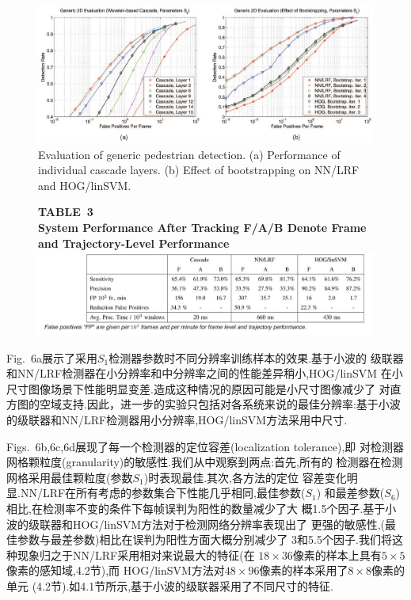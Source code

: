 \documentclass[10pt,letterpaper,journal,compsoc]{IEEEtran}
\begin{document}
\begin{figure}[!b]
\centering
\includegraphics[width=5in]{fig7.JPG}
\caption{Evaluation of generic pedestrian detection. (a) Performance of individual cascade layers. (b) Effect of bootstrapping on NN/LRF and
HOG/linSVM.}
\end{figure}
\begin{figure}[!b]
\centering
\large{\textbf{TABLE~3\\
System Performance After Tracking F/A/B Denote Frame and Trajectory-Level Performance
}}
\includegraphics[width=7in]{table3.JPG}
\end{figure}
Fig.~6a展示了采用$S_1$检测器参数时不同分辨率训练样本的效果.基于小波的
级联器和NN/LRF检测器在小分辨率和中分辨率之间的性能差异稍小,HOG/linSVM
在小尺寸图像场景下性能明显变差.造成这种情况的原因可能是小尺寸图像减少了
对直方图的空域支持.因此，进一步的实验只包括对各系统来说的最佳分辨率:基于小波
的级联器和NN/LRF检测器用小分辨率,HOG/linSVM方法采用中尺寸.

Figs.~6b,6c,6d展现了每一个检测器的定位容差(localization tolerance),即
对检测器网格颗粒度(granularity)的敏感性.我们从中观察到两点:首先,所有的
检测器在检测网格采用最佳颗粒度(参数$S_1$)时表现最佳.其次,各方法的定位
容差变化明显.NN/LRF在所有考虑的参数集合下性能几乎相同,最佳参数($S_1$)
和最差参数($S_6$)相比,在检测率不变的条件下每帧误判为阳性的数量减少了大
概1.5个因子.基于小波的级联器和HOG/linSVM方法对于检测网络分辨率表现出了
更强的敏感性,(最佳参数与最差参数)相比在误判为阳性方面大概分别减少了
3和5.5个因子.我们将这种现象归之于NN/LRF采用相对来说最大的特征(在
$18\times36$像素的样本上具有$5\times5$像素的感知域,4.2节),而
HOG/linSVM方法对$48\times96$像素的样本采用了$8\times8$像素的单元
(4.2节).如4.1节所示,基于小波的级联器采用了不同尺寸的特征.
\end{document}
